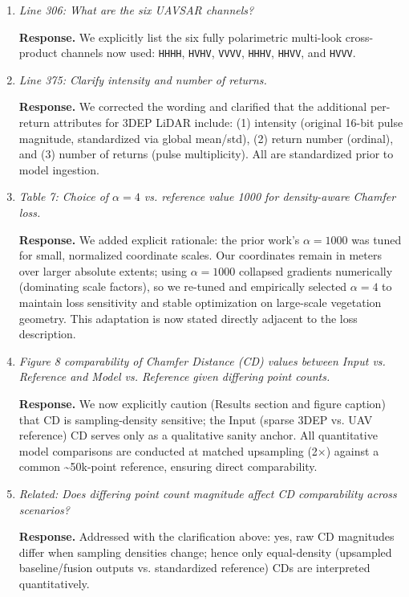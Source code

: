 \documentclass[11pt]{article}
\newcommand{\response}{\textbf{Response.} }
\begin{document}
\begin{enumerate}
  \item \emph{Line 306: What are the six UAVSAR channels?}

  \response We explicitly list the six fully polarimetric multi-look cross-product channels now used: \texttt{HHHH}, \texttt{HVHV}, \texttt{VVVV}, \texttt{HHHV}, \texttt{HHVV}, and \texttt{HVVV}. 

  \item \emph{Line 375: Clarify intensity and \emph{number of returns}.}

  \response We corrected the wording and clarified that the additional per-return attributes for 3DEP LiDAR include: (1) intensity (original 16-bit pulse magnitude, standardized via global mean/std), (2) return number (ordinal), and (3) number of returns (pulse multiplicity). All are standardized prior to model ingestion.

  \item \emph{Table 7: Choice of $\alpha=4$ vs. reference value 1000 for density-aware Chamfer loss.}

  \response We added explicit rationale: the prior work’s $\alpha=1000$ was tuned for small, normalized coordinate scales. Our coordinates remain in meters over larger absolute extents; using $\alpha=1000$ collapsed gradients numerically (dominating scale factors), so we re-tuned and empirically selected $\alpha=4$ to maintain loss sensitivity and stable optimization on large-scale vegetation geometry. This adaptation is now stated directly adjacent to the loss description.

  \item \emph{Figure 8 comparability of Chamfer Distance (CD) values between Input vs. Reference and Model vs. Reference given differing point counts.}

  \response We now explicitly caution (Results section and figure caption) that CD is sampling-density sensitive; the Input (sparse 3DEP vs. UAV reference) CD serves only as a qualitative sanity anchor. All quantitative model comparisons are conducted at matched upsampling (2×) against a common \textasciitilde50k-point reference, ensuring direct comparability.

  \item \emph{Related: Does differing point count magnitude affect CD comparability across scenarios?}

  \response Addressed with the clarification above: yes, raw CD magnitudes differ when sampling densities change; hence only equal-density (upsampled baseline/fusion outputs vs. standardized reference) CDs are interpreted quantitatively.


\end{enumerate}
\end{document}
